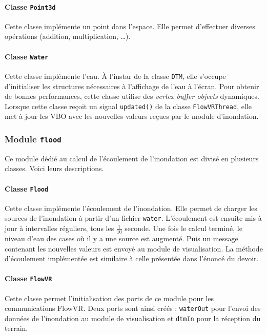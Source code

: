 \documentclass[a4paper, 12pt]{article}
\begin{document}
\paragraph{Classe \texttt{Point3d}}

Cette classe implémente un point dans l'espace. Elle permet d'effectuer diverses
opérations (addition, multiplication, \dots).

\paragraph{Classe \texttt{Water}}

Cette classe implémente l'eau. À l'instar de la classe \texttt{DTM}, elle
s'occupe d'initialiser les structures nécessaires à l'affichage de l'eau à
l'écran. Pour obtenir de bonnes performances, cette classe utilise des
\textit{vertex buffer objects} dynamiques. Lorsque cette classe reçoit un signal
\texttt{updated()} de la classe \texttt{FlowVRThread}, elle met à jour les VBO
avec les nouvelles valeurs reçues par le module d'inondation.

\subsubsection{Module \texttt{flood}}

Ce module dédié au calcul de l'écoulement de l'inondation est divisé en
plusieurs classes. Voici leurs descriptions.

\paragraph{Classe \texttt{Flood}}

Cette classe implémente l'écoulement de l'inondation. Elle permet de charger les
sources de l'inondation à partir d'un fichier \texttt{water}. L'écoulement est
ensuite mis à jour à intervalles réguliers, tous les $\frac{1}{10}$ seconde. Une
fois le calcul terminé, le niveau d'eau des cases où il y a une source est
augmenté.  Puis un message contenant les nouvelles valeurs est envoyé au module
de visualisation. La méthode d'écoulement implémentée est similaire à celle
présentée dans l'énoncé du devoir.

\paragraph{Classe \texttt{FlowVR}}

Cette classe permet l'initialisation des ports de ce module pour les
communications FlowVR. Deux ports sont ainsi créés : \texttt{waterOut} pour
l'envoi des données de l'inondation au module de visualisation et \texttt{dtmIn}
pour la réception du terrain.
\end{document}
